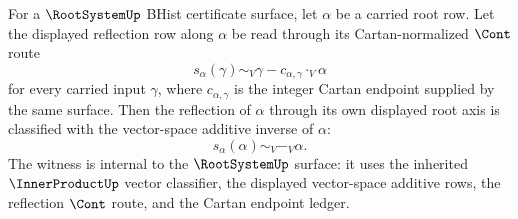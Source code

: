 \begin{theorem}
\label{thm:rootsystem-simple-reflection-axis-negation}
For a $\RootSystemUp$ BHist certificate surface, let $\alpha$ be a carried root row. Let the displayed reflection row along $\alpha$ be read through its Cartan-normalized $\Cont$ route
$$
s_\alpha(\gamma)
\sim_V
\gamma-c_{\alpha,\gamma}\cdot_V\alpha
$$
for every carried input $\gamma$, where $c_{\alpha,\gamma}$ is the integer Cartan endpoint supplied by the same surface. Then the reflection of $\alpha$ through its own displayed root axis is classified with the vector-space additive inverse of $\alpha$:
$$
s_\alpha(\alpha)\sim_V -_V\alpha.
$$
The witness is internal to the $\RootSystemUp$ surface: it uses the inherited $\InnerProductUp$ vector classifier, the displayed vector-space additive rows, the reflection $\Cont$ route, and the Cartan endpoint ledger.
\end{theorem}

